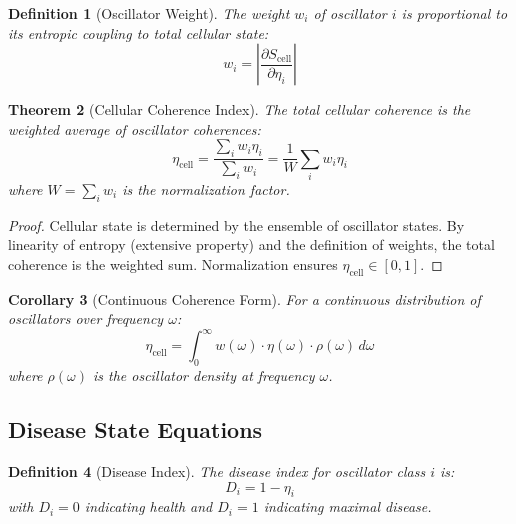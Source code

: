 \documentclass[aps,prd,twocolumn,superscriptaddress,floatfix,nofootinbib]{revtex4-2}
\newtheorem{theorem}{Theorem}[section]
\newtheorem{corollary}[theorem]{Corollary}
\newtheorem{definition}[theorem]{Definition}
\theoremstyle{remark}
\begin{document}
\begin{definition}[Oscillator Weight]
\label{def:oscillator_weight}
The weight $w_i$ of oscillator $i$ is proportional to its entropic coupling to total cellular state:
\begin{equation}
w_i = \left|\frac{\partial S_{\mathrm{cell}}}{\partial \eta_i}\right|
\end{equation}
\end{definition}

\begin{theorem}[Cellular Coherence Index]
\label{thm:cellular_coherence}
The total cellular coherence is the weighted average of oscillator coherences:
\begin{equation}
\eta_{\mathrm{cell}} = \frac{\sum_i w_i \eta_i}{\sum_i w_i} = \frac{1}{W}\sum_{i} w_i \eta_i
\label{eq:cellular_coherence}
\end{equation}
where $W = \sum_i w_i$ is the normalization factor.
\end{theorem}

\begin{proof}
Cellular state is determined by the ensemble of oscillator states. By linearity of entropy (extensive property) and the definition of weights, the total coherence is the weighted sum. Normalization ensures $\eta_{\mathrm{cell}} \in [0, 1]$.
\end{proof}

\begin{corollary}[Continuous Coherence Form]
For a continuous distribution of oscillators over frequency $\omega$:
\begin{equation}
\eta_{\mathrm{cell}} = \int_0^\infty w(\omega) \cdot \eta(\omega) \cdot \rho(\omega) \, d\omega
\end{equation}
where $\rho(\omega)$ is the oscillator density at frequency $\omega$.
\end{corollary}

\subsection{Disease State Equations}

\begin{definition}[Disease Index]
\label{def:disease_index}
The disease index for oscillator class $i$ is:
\begin{equation}
D_i = 1 - \eta_i
\end{equation}
with $D_i = 0$ indicating health and $D_i = 1$ indicating maximal disease.
\end{definition}
\end{document}
